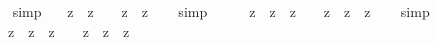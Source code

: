 \begin{isabellebody}
\isadelimproof
\ %
\endisadelimproof
%
\isatagproof
{}\isamarkupfalse%
\ {\isacharparenleft}simp{\isacharparenright}\ \isamarkupfalse%
%
\endisatagproof
{\isafoldproof}%
%
\isadelimproof
%
\endisadelimproof
\isanewline
{}\isamarkupfalse%
\ {\isachardoublequoteopen}{\isacharcomma}{\isasymphi}{\isacharcomma}\ {\isasymand}\isactrlsup z\ {\isacharcomma}{\isasympsi}{\isacharcomma}\ {\isasymrightarrow}\isactrlsup z\ {\isacharcomma}{\isasymchi}{\isacharcomma}\ {\isasymequiv}\ {\isacharcomma}{\isasymphi}{\isacharcomma}\ {\isasymand}\isactrlsup z\ {\isacharparenleft}{\isacharcomma}{\isasympsi}{\isacharcomma}\ {\isasymrightarrow}\isactrlsup z\ {\isacharcomma}{\isasymchi}{\isacharcomma}{\isacharparenright}{\isachardoublequoteclose}%
\isadelimproof
\ %
\endisadelimproof
%
\isatagproof
{}\isamarkupfalse%
\ {\isacharparenleft}simp{\isacharparenright}%
\endisatagproof
{\isafoldproof}%
%
\isadelimproof
%
\endisadelimproof
\ \isamarkupfalse%
%
\isadelimproof
\ %
\endisadelimproof
%
\isatagproof
{}\isamarkupfalse%
%
\endisatagproof
{\isafoldproof}%
%
\isadelimproof
%
\endisadelimproof
\isanewline
\isanewline
{}\isamarkupfalse%
\ {\isachardoublequoteopen}{\isacharparenleft}{\isacharcomma}{\isasymphi}{\isacharcomma}\ {\isasymand}\isactrlsup z\ {\isacharcomma}{\isasympsi}{\isacharcomma}\ {\isasymequiv}\isactrlsup z\ {\isacharcomma}{\isasymphi}{\isacharcomma}\ {\isasymand}\isactrlsup z\ {\isacharcomma}{\isasympsi}{\isacharcomma}{\isacharparenright}\ {\isasymequiv}\ {\isacharparenleft}{\isacharparenleft}{\isacharcomma}{\isasymphi}{\isacharcomma}\ {\isasymand}\isactrlsup z\ {\isacharcomma}{\isasympsi}{\isacharcomma}{\isacharparenright}\ {\isasymequiv}\isactrlsup z\ {\isacharparenleft}{\isacharcomma}{\isasymphi}{\isacharcomma}\ {\isasymand}\isactrlsup z\ {\isacharcomma}{\isasympsi}{\isacharcomma}{\isacharparenright}{\isacharparenright}{\isachardoublequoteclose}%
\isadelimproof
\ %
\endisadelimproof
%
\isatagproof
{}\isamarkupfalse%
\ {\isacharparenleft}simp{\isacharparenright}\ \isamarkupfalse%
%
\endisatagproof
{\isafoldproof}%
%
\isadelimproof
%
\endisadelimproof
\isanewline
{}\isamarkupfalse%
\ {\isachardoublequoteopen}{\isacharparenleft}{\isacharcomma}{\isasymphi}{\isacharcomma}\ {\isasymand}\isactrlsup z\ {\isacharcomma}{\isasympsi}{\isacharcomma}\ {\isasymequiv}\isactrlsup z\ {\isacharcomma}{\isasymphi}{\isacharcomma}\ {\isasymand}\isactrlsup z\ {\isacharcomma}{\isasympsi}{\isacharcomma}{\isacharparenright}\ {\isasymequiv}\ {\isacharparenleft}{\isacharcomma}{\isasymphi}{\isacharcomma}\ {\isasymand}\isactrlsup z\ {\isacharparenleft}{\isacharcomma}{\isasympsi}{\isacharcomma}\ {\isasymequiv}\isactrlsup z\ {\isacharcomma}{\isasymphi}{\isacharcomma}{\isacharparenright}\ {\isasymand}\isactrlsup z\ {\isacharcomma}{\isasympsi}{\isacharcomma}{\isacharparenright}{\isachardoublequoteclose}%

\end{isabellebody}

